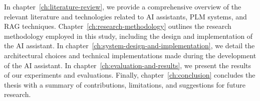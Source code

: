 In chapter~\ref{ch:literature-review}, we provide a comprehensive overview of the relevant literature and technologies related to AI assistants, PLM systems, and RAG techniques. Chapter~\ref{ch:research-methodology} outlines the research methodology employed in this study, including the design and implementation of the AI assistant. In chapter~\ref{ch:system-design-and-implementation}, we detail the architectural choices and technical implementations made during the development of the AI assistant. In chapter~\ref{ch:evaluation-and-results}, we present the results of our experiments and evaluations. Finally, chapter~\ref{ch:conclusion} concludes the thesis with a summary of contributions, limitations, and suggestions for future research.
